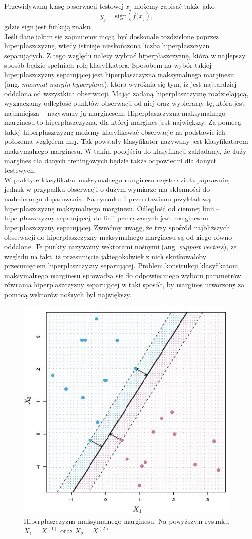 \documentclass[a4paper]{article}
\begin{document}
Przewidywaną klasę obserwacji testowej $x_j$ możemy zapisać także jako 
\begin{equation}
    y_j = \textrm{sign}\left(f(x_j\right),
\end{equation}
gdzie $\textrm{sign}$ jest funkcją znaku.
\\\indent Jeśli dane jakim się zajmujemy mogą być doskonale rozdzielone poprzez hiperpłaszczyznę, wtedy istnieje nieskończona liczba hiperpłaszczyzn separujących. Z tego względu należy wybrać hiperpłaszczyznę, która w najlepszy sposób będzie spełniała rolę klasyfikatora. Sposobem na wybór takiej hiperpłaszczyzny separującej jest hiperpłaszczyzna maksymalnego marginesu (ang. \textit{maximal margin hyperplane}), która wyróżnia się tym, iż jest najbardziej oddalona od wszystkich obserwacji. Mając zadaną hiperpłaszczyznę rozdzielającą, wyznaczamy odległość punktów obserwacji od niej oraz wybieramy tę, która jest najmniejsza -- nazywamy ją marginesem. Hiperpłaszczyzna maksymalnego marginesu to hiperpłaszczyzna, dla której margines jest największy. Za pomocą takiej hiperpłaszczyznę możemy klasyfikować obserwacje na podstawie ich położenia względem niej. Tak powstały klasyfikator nazywany jest klasyfikatorem maksymalnego marginesu. W takim podejściu do klasyfikacji zakładamy, że duży margines dla danych treningowych będzie także odpowiedni dla danych testowych. \\\indent  W praktyce klasyfikator maksymalnego marginesu często działa poprawnie, jednak w przypadku obserwacji o dużym wymiarze ma skłonności do nadmiernego dopasowania. Na rysunku \ref{2.10} przedstawiono przykładową hiperpłaszczyznę maksymalnego marginesu. Odległość od ciemnej linii -- hiperpłaszczyzny separującej, do linii przerywanych jest marginesem hiperpłaszczyzny separującej. Zwróćmy uwagę, że trzy spośród najbliższych obserwacji do hiperpłaszczyzny maksymalnego marginesu są od niego równo oddalone. Te punkty nazywamy wektorami nośnymi (ang. \textit{support vectors}), ze względu na fakt, iż przesunięcie jakiegokolwiek z nich skutkowałoby przesunięciem hiperpłaszczyzny separującej. Problem konstrukcji klasyfikatora maksymalnego marginesu sprowadza się do odpowiedniego wyboru parametrów równania hiperpłaszczyzny separującej w taki sposób, by margines utworzony za pomocą wektorów nośnych był największy.
\begin{figure}[ht]
    \centering
    \includegraphics[width = 210 pt, height = 190 pt]{MAXMARGIN.JPG}
    \caption{Hiperpłaszczyzna maksymalnego marginesu. Na powyższym rysunku $X_1 = X^{(1)}$ oraz $X_2 = X^{(2)}$.}
    \label{2.10}
\end{figure}\newpage
\end{document}
